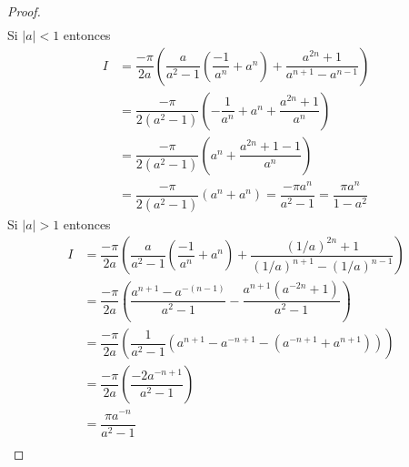 \documentclass{article}
\begin{document}
\begin{proof}
\begin{align*}
    \end{align*}
    Si \( |a| < 1 \) entonces \begin{align*}
        I & = \dfrac{-\pi}{2a} \left( \dfrac{a}{a^2 - 1} \left( \dfrac{-1}{a^n} + a^n \right) + \dfrac{a^{2n} + 1}{a^{n+1} - a^{n-1}} \right) \\
          & = \dfrac{-\pi}{2(a^2 - 1)} \left( -\dfrac{1}{a^n} + a^n + \dfrac{a^{2n} + 1}{a^n} \right)                                         \\
          & = \dfrac{-\pi}{2(a^2 - 1)} \left( a^n + \dfrac{a^{2n} + 1 - 1}{a^n} \right)                                                       \\
          & = \dfrac{-\pi}{2(a^2 - 1)} \left( a^n + a^n \right) = \dfrac{-\pi a^n}{a^2 - 1} = \dfrac{\pi a^n}{1 - a^2}
    \end{align*}
    Si \( |a| > 1 \) entonces \begin{align*}
        I & = \dfrac{-\pi}{2a} \left( \dfrac{a}{a^2 - 1} \left( \dfrac{-1}{a^n} + a^n \right) + \dfrac{{(1/a)}^{2n} + 1}{{(1/a)}^{n+1} - {(1/a)}^{n-1}} \right) \\
          & =  \dfrac{-\pi}{2a} \left(\dfrac{a^{n+1} - a^{-(n-1)}}{a^2-1} - \dfrac{a^{n+1}(a^{-2n}+1)}{a^2-1} \right)                                           \\
          & = \dfrac{-\pi}{2a} \left( \dfrac{1}{a^2-1} \left( a^{n+1} - a^{-n+1} - (a^{-n+1} + a^{n+1}) \right)     \right)                                     \\
          & = \dfrac{-\pi}{2a} \left( \dfrac{-2a^{-n+1}}{a^2-1} \right)                                                                                         \\
          & = \dfrac{\pi a^{-n}}{a^2 - 1}                                                                                                                       \\
    \end{align*}
\end{proof}
\end{document}
